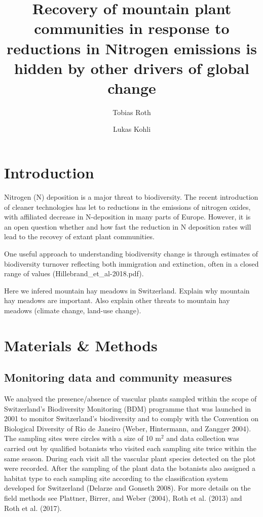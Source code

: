 \documentclass[fleqn,10pt,lineno]{wlpeerj} %
\title{Recovery of mountain plant communities in response to reductions in
Nitrogen emissions is hidden by other drivers of global change}
\author[1, 2]{Tobias Roth}
\author[2]{Lukas Kohli}
\affil[1]{Zoological Institute, University of Basel, Basel, Switzerland}
\affil[2]{Hintermann Weber AG, Austrasse 2a, 4153 Reinach, Switzerland}
\theoremstyle{definition}
\theoremstyle{definition}
\theoremstyle{definition}
\theoremstyle{remark}
\begin{document}
\flushbottom
\maketitle
\thispagestyle{empty}

\section*{Introduction}\label{introduction}

Nitrogen (N) deposition is a major threat to biodiversity. The recent
introduction of cleaner technologies has let to reductions in the
emissions of nitrogen oxides, with affiliated decrease in N-deposition
in many parts of Europe. However, it is an open question whether and how
fast the reduction in N deposition rates will lead to the recovey of
extant plant communities.

One useful approach to understanding biodiversity change is through
estimates of biodiversity turnover reflecting both immigration and
extinction, often in a closed range of values
(Hillebrand\_et\_al-2018.pdf).

Here we infered mountain hay meadows in Switzerland. Explain why
mountain hay meadows are important. Also explain other threats to
mountain hay meadows (climate change, land-use change).

\section*{Materials \& Methods}\label{materials-methods}

\subsection*{Monitoring data and community
measures}\label{monitoring-data-and-community-measures}

We analysed the presence/absence of vascular plants sampled within the
scope of Switzerland's Biodiversity Monitoring (BDM) programme that was
launched in 2001 to monitor Switzerland's biodiversity and to comply
with the Convention on Biological Diversity of Rio de Janeiro (Weber,
Hintermann, and Zangger 2004). The sampling sites were circles with a
size of 10 m\(^2\) and data collection was carried out by qualified
botanists who visited each sampling site twice within the same season.
During each visit all the vascular plant species detected on the plot
were recorded. After the sampling of the plant data the botanists also
assigned a habitat type to each sampling site according to the
classification system developed for Switzerland (Delarze and Gonseth
2008). For more details on the field methods see Plattner, Birrer, and
Weber (2004), Roth et al. (2013) and Roth et al. (2017).
\end{document}
